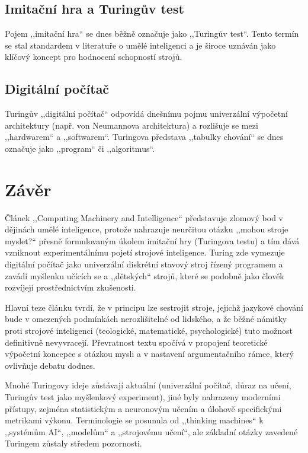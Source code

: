 \documentclass[a4paper,oneside,11pt,usenames,dvipsnames]{article}
\begin{document}
\subsection{Imitační hra a Turingův test}
\label{subsec:terminologie-imitacni-hra}
Pojem ,,imitační hra`` se dnes běžně označuje jako ,,Turingův test``. Tento termín se stal standardem v literatuře o umělé inteligenci a je široce uznáván jako klíčový koncept pro hodnocení schopností strojů.

\subsection{Digitální počítač}
\label{subsec:terminologie-digitani-pocitac}
Turingův ,,digitální počítač`` odpovídá dnešnímu pojmu univerzální výpočetní architektury (např. von Neumannova architektura) a rozlišuje se mezi ,,hardwarem`` a ,,softwarem``. Turingova představa ,,tabulky chování`` se dnes označuje jako ,,program`` či ,,algoritmus``.

\section{Závěr}
\label{sec:zaver}

Článek ,,Computing Machinery and Intelligence`` představuje zlomový bod v dějinách umělé inteligence, protože nahrazuje neurčitou otázku ,,mohou stroje myslet?{}`` přesně formulovaným úkolem imitační hry (Turingova testu) a tím dává vzniknout experimentálnímu pojetí strojové inteligence. Turing zde vymezuje digitální počítač jako univerzální diskrétní stavový stroj řízený programem a zavádí myšlenku učících se a ,,dětských`` strojů, které se podobně jako člověk rozvíjejí prostřednictvím zkušenosti.

Hlavní teze článku tvrdí, že v principu lze sestrojit stroje, jejichž jazykové chování bude v omezených podmínkách nerozlišitelné od lidského, a že běžné námitky proti strojové inteligenci (teologické, matematické, psychologické) tuto možnost definitivně nevyvracejí. Převratnost textu spočívá v propojení teoretické výpočetní koncepce s otázkou mysli a v nastavení argumentačního rámce, který ovlivňuje debatu dodnes.

Mnohé Turingovy ideje zůstávají aktuální (univerzální počítač, důraz na učení, Turingův test jako myšlenkový experiment), jiné byly nahrazeny moderními přístupy, zejména statistickým a neuronovým učením a úlohově specifickými metrikami výkonu. Terminologie se posunula od ,,thinking machines`` k ,,systémům AI``, ,,modelům`` a ,,strojovému učení``, ale základní otázky zavedené Turingem zůstaly středem pozornosti.
\end{document}
